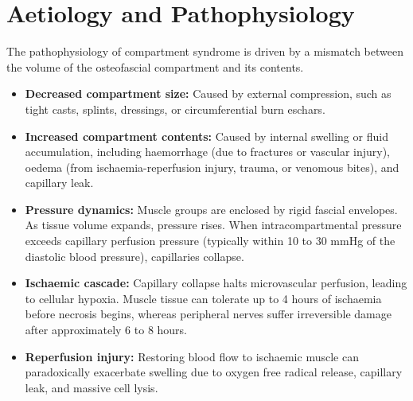 \section*{Aetiology and Pathophysiology}
The pathophysiology of compartment syndrome is driven by a mismatch between the volume of the osteofascial compartment and its contents.
\begin{itemize}
    \item \textbf{Decreased compartment size:} Caused by external compression, such as tight casts, splints, dressings, or circumferential burn eschars.
    \item \textbf{Increased compartment contents:} Caused by internal swelling or fluid accumulation, including haemorrhage (due to fractures or vascular injury), oedema (from ischaemia-reperfusion injury, trauma, or venomous bites), and capillary leak.
    \item \textbf{Pressure dynamics:} Muscle groups are enclosed by rigid fascial envelopes. As tissue volume expands, pressure rises. When intracompartmental pressure exceeds capillary perfusion pressure (typically within 10 to 30 mmHg of the diastolic blood pressure), capillaries collapse.
    \item \textbf{Ischaemic cascade:} Capillary collapse halts microvascular perfusion, leading to cellular hypoxia. Muscle tissue can tolerate up to 4 hours of ischaemia before necrosis begins, whereas peripheral nerves suffer irreversible damage after approximately 6 to 8 hours.
    \item \textbf{Reperfusion injury:} Restoring blood flow to ischaemic muscle can paradoxically exacerbate swelling due to oxygen free radical release, capillary leak, and massive cell lysis.
\end{itemize}

